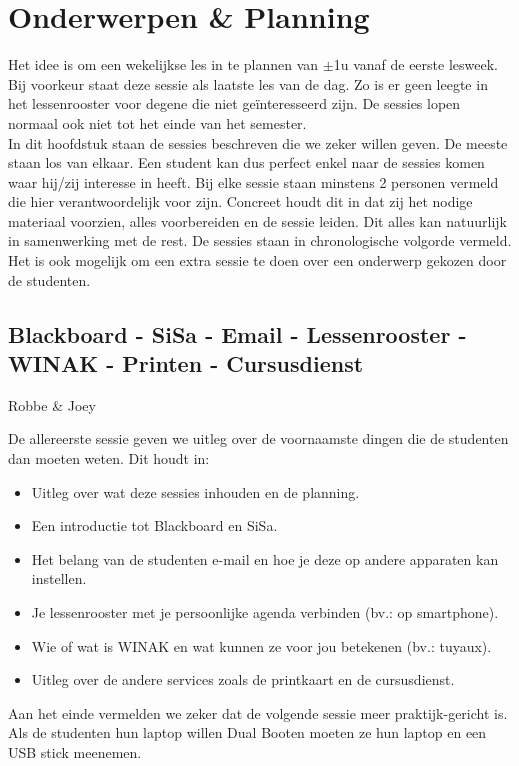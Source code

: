 \documentclass[a4paper]{article}
\begin{document}
	\section{Onderwerpen \& Planning}
		Het idee is om een wekelijkse les in te plannen van $\pm$1u vanaf de eerste lesweek. Bij voorkeur staat deze sessie als laatste les van de dag. Zo is er geen leegte in het lessenrooster voor degene die niet ge\"interesseerd zijn. De sessies lopen normaal ook niet tot het einde van het semester. \\
		In dit hoofdstuk staan de sessies beschreven die we zeker willen geven. De meeste staan los van elkaar. Een student kan dus perfect enkel naar de sessies komen waar hij/zij interesse in heeft. Bij elke sessie staan minstens 2 personen vermeld die hier verantwoordelijk voor zijn. Concreet houdt dit in dat zij het nodige materiaal voorzien, alles voorbereiden en de sessie leiden. Dit alles kan natuurlijk in samenwerking met de rest. De sessies staan in chronologische volgorde vermeld. Het is ook mogelijk om een extra sessie te doen over een onderwerp gekozen door de studenten.
		
		\subsection{Blackboard - SiSa - Email - Lessenrooster - WINAK - Printen - Cursusdienst}
			\begin{flushright}
				Robbe \& Joey
			\end{flushright}
			De allereerste sessie geven we uitleg over de voornaamste dingen die de studenten dan moeten weten. Dit houdt in:
			\begin{itemize}
				\item Uitleg over wat deze sessies inhouden en de planning.
				\item Een introductie tot Blackboard en SiSa.
				\item Het belang van de studenten e-mail en hoe je deze op andere apparaten kan instellen.
				\item Je lessenrooster met je persoonlijke agenda verbinden (bv.: op smartphone).
				\item Wie of wat is WINAK en wat kunnen ze voor jou betekenen (bv.: tuyaux).
				\item Uitleg over de andere services zoals de printkaart en de cursusdienst.
			\end{itemize}
			Aan het einde vermelden we zeker dat de volgende sessie meer praktijk-gericht is. Als de studenten hun laptop willen Dual Booten moeten ze hun laptop en een USB stick meenemen.
			
\end{document}
